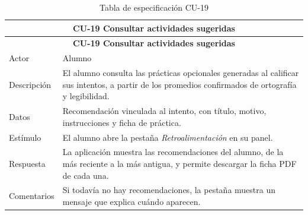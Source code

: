 \begin{longtable}{|p{4cm}|p{11cm}|}
\caption{Tabla de especificación CU-19}
\label{tab:cu19} \\

\hline
\multicolumn{2}{|c|}{\textbf{CU-19 Consultar actividades sugeridas}} \\
\hline
\endfirsthead

\hline
\multicolumn{2}{|c|}{\textbf{CU-19 Consultar actividades sugeridas}} \\
\hline
\endhead

\hline
\endfoot
\endlastfoot

Actor & Alumno \\
\hline

Descripción & El alumno consulta las prácticas opcionales generadas al calificar sus intentos, a partir de los promedios confirmados de ortografía y legibilidad. \\
\hline

Datos & Recomendación vinculada al intento, con título, motivo, instrucciones y ficha de práctica. \\
\hline

Estímulo & El alumno abre la pestaña \textit{Retroalimentación} en su panel. \\
\hline

Respuesta & La aplicación muestra las recomendaciones del alumno, de la más reciente a la más antigua, y permite descargar la ficha PDF de cada una. \\
\hline

Comentarios & Si todavía no hay recomendaciones, la pestaña muestra un mensaje que explica cuándo aparecen. \\
\hline

\end{longtable}


